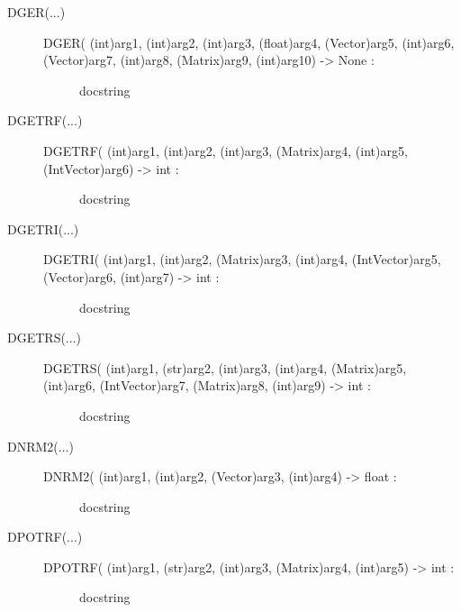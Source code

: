 \documentclass[letterpaper,10pt,english]{sphinxmanual}
\begin{document}
\begin{description}
\begin{description}
\item[{DGER(...)}] \leavevmode\begin{description}
\item[{DGER( (int)arg1, (int)arg2, (int)arg3, (float)arg4, (Vector)arg5, (int)arg6, (Vector)arg7, (int)arg8, (Matrix)arg9, (int)arg10) -\textgreater{} None :}] \leavevmode
docstring

\end{description}

\item[{DGETRF(...)}] \leavevmode\begin{description}
\item[{DGETRF( (int)arg1, (int)arg2, (int)arg3, (Matrix)arg4, (int)arg5, (IntVector)arg6) -\textgreater{} int :}] \leavevmode
docstring

\end{description}

\item[{DGETRI(...)}] \leavevmode\begin{description}
\item[{DGETRI( (int)arg1, (int)arg2, (Matrix)arg3, (int)arg4, (IntVector)arg5, (Vector)arg6, (int)arg7) -\textgreater{} int :}] \leavevmode
docstring

\end{description}

\item[{DGETRS(...)}] \leavevmode\begin{description}
\item[{DGETRS( (int)arg1, (str)arg2, (int)arg3, (int)arg4, (Matrix)arg5, (int)arg6, (IntVector)arg7, (Matrix)arg8, (int)arg9) -\textgreater{} int :}] \leavevmode
docstring

\end{description}

\item[{DNRM2(...)}] \leavevmode\begin{description}
\item[{DNRM2( (int)arg1, (int)arg2, (Vector)arg3, (int)arg4) -\textgreater{} float :}] \leavevmode
docstring

\end{description}

\item[{DPOTRF(...)}] \leavevmode\begin{description}
\item[{DPOTRF( (int)arg1, (str)arg2, (int)arg3, (Matrix)arg4, (int)arg5) -\textgreater{} int :}] \leavevmode
docstring


\end{description}
\end{description}
\end{description}
\end{document}

